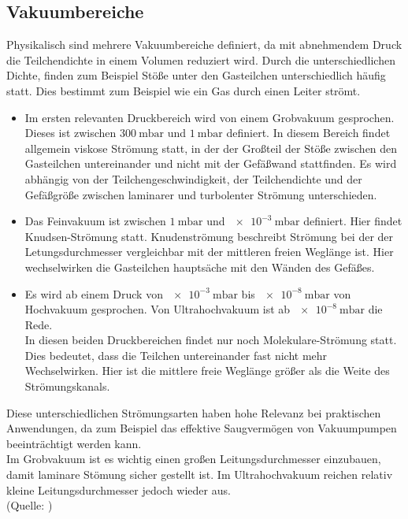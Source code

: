 	\subsection{Vakuumbereiche}

		\noindent
		Physikalisch sind mehrere Vakuumbereiche definiert, da mit abnehmendem Druck die Teilchendichte in einem Volumen reduziert wird.
		Durch die unterschiedlichen Dichte, finden zum Beispiel Stöße unter den Gasteilchen unterschiedlich häufig statt.
		Dies bestimmt zum Beispiel wie ein Gas durch einen Leiter strömt.
		
		\begin{itemize}
			\item
			Im ersten relevanten Druckbereich wird von einem Grobvakuum gesprochen. Dieses ist zwischen $\SI{300}{\milli\bar}$ und $\SI{1}{\milli\bar}$ definiert.
			In diesem Bereich findet allgemein viskose Strömung statt, in der der Großteil der Stöße zwischen den Gasteilchen untereinander und nicht mit der Gefäßwand stattfinden.
			Es wird abhängig von der Teilchengeschwindigkeit, der Teilchendichte und der Gefäßgröße zwischen laminarer und turbolenter Strömung unterschieden. 

			\item
			Das Feinvakuum ist zwischen $\SI{1}{\milli\bar}$ und $\SI{e-3}{\milli\bar}$ definiert. Hier findet Knudsen-Strömung statt.
			Knudenströmung beschreibt Strömung bei der der Letungsdurchmesser vergleichbar mit der mittleren freien Weglänge ist.
			Hier wechselwirken die Gasteilchen hauptsäche mit den Wänden des Gefäßes.

			\item
			Es wird ab einem Druck von $\SI{e-3}{\milli\bar}$ bis $\SI{e-8}{\milli\bar}$ von Hochvakuum gesprochen. Von Ultrahochvakuum ist ab $\SI{e-8}{\milli\bar}$ die Rede.	\\	
			In diesen beiden Druckbereichen findet nur noch Molekulare-Strömung statt.\\
			Dies bedeutet, dass die Teilchen untereinander fast nicht mehr Wechselwirken. 
			Hier ist die mittlere freie Weglänge größer als die Weite des Strömungskanals.
		\end{itemize}
		Diese unterschiedlichen Strömungsarten haben hohe Relevanz bei praktischen Anwendungen, da zum Beispiel das effektive Saugvermögen von Vakuumpumpen beeinträchtigt werden kann.\\
		Im Grobvakuum ist es wichtig einen großen Leitungsdurchmesser einzubauen, damit laminare Stömung sicher gestellt ist.
		Im Ultrahochvakuum reichen relativ kleine Leitungsdurchmesser jedoch wieder aus.\\
		(Quelle: \cite{pfeiffer:grund})

